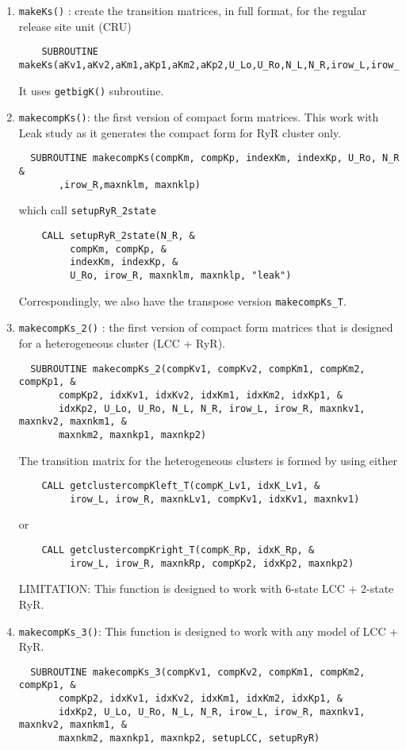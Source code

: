 \begin{enumerate}
  \item \verb!makeKs()! : create the transition matrices, in full format, for
  the regular release site unit (CRU)
  \begin{lstlisting}
    SUBROUTINE makeKs(aKv1,aKv2,aKm1,aKp1,aKm2,aKp2,U_Lo,U_Ro,N_L,N_R,irow_L,irow_R)
  \end{lstlisting}
	It uses \verb!getbigK()! subroutine. 
  
  \item \verb!makecompKs()!: the first version of compact form matrices. This
  work with Leak study as it generates the compact form for RyR cluster only.
\begin{lstlisting}
  SUBROUTINE makecompKs(compKm, compKp, indexKm, indexKp, U_Ro, N_R &
       ,irow_R,maxnklm, maxnklp)
\end{lstlisting}
which call \verb!setupRyR_2state!
\begin{verbatim}
    CALL setupRyR_2state(N_R, &
         compKm, compKp, &
         indexKm, indexKp, &
         U_Ro, irow_R, maxnklm, maxnklp, "leak")
\end{verbatim}
Correspondingly, we also have the transpose version \verb!makecompKs_T!.

\item \verb!makecompKs_2()! : the first version of compact form matrices that is
designed for a heterogeneous cluster (LCC + RyR). 
\begin{lstlisting}
  SUBROUTINE makecompKs_2(compKv1, compKv2, compKm1, compKm2, compKp1, &
       compKp2, idxKv1, idxKv2, idxKm1, idxKm2, idxKp1, &
       idxKp2, U_Lo, U_Ro, N_L, N_R, irow_L, irow_R, maxnkv1, maxnkv2, maxnkm1, &
       maxnkm2, maxnkp1, maxnkp2)
\end{lstlisting}
The transition matrix for the heterogeneous clusters is formed by using either
\begin{verbatim}
    CALL getclustercompKleft_T(compK_Lv1, idxK_Lv1, &
         irow_L, irow_R, maxnkLv1, compKv1, idxKv1, maxnkv1)
\end{verbatim}
or
\begin{verbatim}
    CALL getclustercompKright_T(compK_Rp, idxK_Rp, &
         irow_L, irow_R, maxnkRp, compKp2, idxKp2, maxnkp2)
\end{verbatim}
LIMITATION: This function is designed to work with 6-state LCC + 2-state RyR. 

\item \verb!makecompKs_3()!: This function is designed to work with any model of
LCC + RyR.
\begin{lstlisting}
  SUBROUTINE makecompKs_3(compKv1, compKv2, compKm1, compKm2, compKp1, &
       compKp2, idxKv1, idxKv2, idxKm1, idxKm2, idxKp1, &
       idxKp2, U_Lo, U_Ro, N_L, N_R, irow_L, irow_R, maxnkv1, maxnkv2, maxnkm1, &
       maxnkm2, maxnkp1, maxnkp2, setupLCC, setupRyR)
\end{lstlisting}


\end{enumerate}
